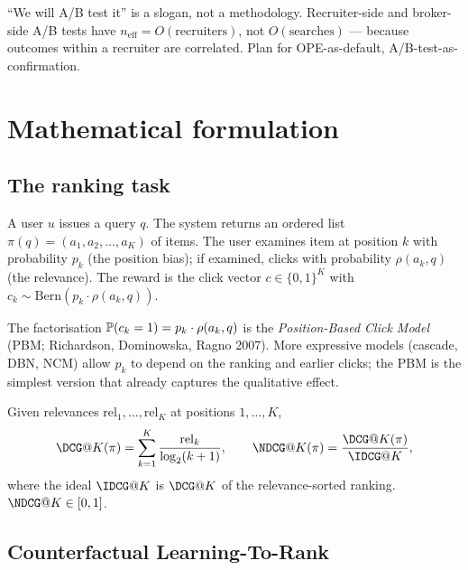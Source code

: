 \documentclass[11pt,oneside]{scrbook}
\begin{document}
\begin{pitfall}
``We will A/B test it'' is a slogan, not a methodology. Recruiter-side and
broker-side A/B tests have $n_{\text{eff}} = O(\text{recruiters})$, not
$O(\text{searches})$ --- because outcomes within a recruiter are correlated.
Plan for OPE-as-default, A/B-test-as-confirmation.
\end{pitfall}

\chapter{Mathematical formulation}

\section{The ranking task}

\begin{definition}
A user $u$ issues a query $q$. The system returns an ordered list
$\pi(q) = (a_1, a_2, \dots, a_K)$ of items. The user examines item at
position $k$ with probability $p_k$ (the position bias); if examined,
clicks with probability $\rho(a_k, q)$ (the relevance). The reward is
the click vector $c \in \{0, 1\}^K$ with $c_k \sim \mathrm{Bern}(p_k \cdot \rho(a_k, q))$.
\end{definition}

The factorisation $\mathbb{P}(c_k = 1) = p_k \cdot \rho(a_k, q)$ is the
\emph{Position-Based Click Model} (PBM; Richardson, Dominowska, Ragno
2007). More expressive models (cascade, DBN, NCM) allow $p_k$ to depend on
the ranking and earlier clicks; the PBM is the simplest version that
already captures the qualitative effect.

\begin{definition}
Given relevances $\mathrm{rel}_1, \dots, \mathrm{rel}_K$ at positions $1, \dots, K$,
\[
\DCG@K(\pi) = \sum_{k=1}^K \frac{\mathrm{rel}_k}{\log_2(k+1)},\qquad
\NDCG@K(\pi) = \frac{\DCG@K(\pi)}{\IDCG@K},
\]
where the ideal $\IDCG@K$ is $\DCG@K$ of the relevance-sorted ranking.
$\NDCG@K \in [0, 1]$.
\end{definition}

\section{Counterfactual Learning-To-Rank}
\end{document}
